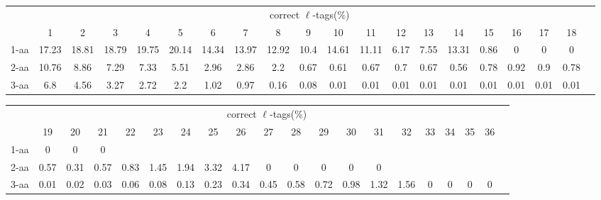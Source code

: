 \documentclass{article}[12pt]
\begin{document}
\begin{landscape}

\begin{table}[h]\tiny
\vspace{3mm}
{\centering
\begin{center}
\begin{tabular}{|l|c|c|c|c|c|c|c|c|c|c|c|c|c|c|c|c|c|c|c|}
  \hline
  & \multicolumn{ 18 }{|c|}{correct $\ell$-tags(\%)} \\
  \cline{2- 19}
    & 1 & 2 & 3 & 4 & 5 & 6 & 7 & 8 & 9 & 10 & 11 & 12 & 13 & 14 & 15 & 16 & 17 & 18\\
  \hline
1-aa  & 17.23 & 18.81 & 18.79 & 19.75 & 20.14 & 14.34 & 13.97 & 12.92 & 10.4 & 14.61 & 11.11 & 6.17 & 7.55 & 13.31 & 0.86 & 0 & 0 & 0\\
2-aa  & 10.76 & 8.86 & 7.29 & 7.33 & 5.51 & 2.96 & 2.86 & 2.2 & 0.67 & 0.61 & 0.67 & 0.7 & 0.67 & 0.56 & 0.78 & 0.92 & 0.9 & 0.78\\
3-aa  & 6.8 & 4.56 & 3.27 & 2.72 & 2.2 & 1.02 & 0.97 & 0.16 & 0.08 & 0.01 & 0.01 & 0.01 & 0.01 & 0.01 & 0.01 & 0.01 & 0.01 & 0.01\\
 \hline
\end{tabular}
\end{center}
\par}
\centering

\vspace{3mm}
\end{table}
\begin{table}[h]\tiny
\vspace{3mm}
{\centering
\begin{center}
\begin{tabular}{|l|c|c|c|c|c|c|c|c|c|c|c|c|c|c|c|c|c|c|c|}
  \hline
  & \multicolumn{ 18 }{|c|}{correct $\ell$-tags(\%)} \\
  \cline{2- 19}
    & 19 & 20 & 21 & 22 & 23 & 24 & 25 & 26 & 27 & 28 & 29 & 30 & 31 & 32 & 33 & 34 & 35 & 36\\
  \hline
1-aa  & 0 & 0 & 0 &  &  &  &  &  &  &  &  &  &  &  &  &  &  & \\
2-aa  & 0.57 & 0.31 & 0.57 & 0.83 & 1.45 & 1.94 & 3.32 & 4.17 & 0 & 0 & 0 & 0 & 0 &  &  &  &  & \\
3-aa  & 0.01 & 0.02 & 0.03 & 0.06 & 0.08 & 0.13 & 0.23 & 0.34 & 0.45 & 0.58 & 0.72 & 0.98 & 1.32 & 1.56 & 0 & 0 & 0 & 0\\
 \hline
\end{tabular}
\end{center}
\par}
\centering


\end{table}
\end{landscape}
\end{document}
